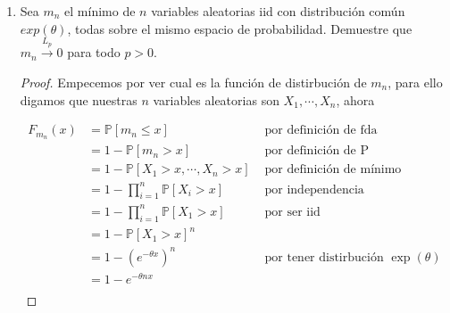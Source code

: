 \documentclass[letterpaper]{article}
\theoremstyle{definition}
\theoremstyle{lemathm}
\theoremstyle{lemademthm}
\newcommand{\pars}[1]{\left( #1 \right) }
\newcommand{\bracs}[1]{\left[ #1 \right] }
\newcommand{\1}{\mathbbm{1}}
\begin{document}
\begin{enumerate}
\begin{proof}
			\[\sum_{i=1}^d X_{i_n} + X_{{d+1}_{n}} \xrightarrow{P} \sum_{i=1}^d X_i + X_{d+1},\]

			es decir 

			\[\sum_{i=1}^{d+1} X_{i_n} \xrightarrow{P} \sum_{i=1}^{d+1} X_i.\]

			Por Inducción Matemática conluimos que la suma de $d$ suceciones convergentes en probabilidad convergen a la suma de sus límites.
		\end{proof}
		
		Recordemos que si $W_n \xrightarrow{L_p} W$ para algún $p\geq1$, entonces para todo $q < p$ se cumple que 
		
		\[W_n \xrightarrow{L_q} W.\]

		Ahora entonces que

		\[X_{n,j} \xrightarrow{L_{p_{n,j}}} X_j, p_{n,j} \geq 1,\]

		luego entonces

		\[X_{n,j} \xrightarrow{P} X_j.\]

		Ahora sean las proyecciones de cada componente $g_i(Y) = (0,\cdots,X_i,0,\cdots,0)$. Al ser $g_i$ continua por el Teorema del mapeo continuo tenemos que

		\[g_i(X_{n,i}) \xrightarrow{P} g_i(X_i).\]

		Por el Lema 2 tenemos

		\[\sum_{i=1}^d g_i(X_{n,i}) \xrightarrow{P} \sum_{i=1}^d g_i(X_i),\]

		por definición concluimos que

		\[\vec{X}_n\overset{P}{\to} \vec{X}\]

		\newpage

		\item Sea $m_n$ el mínimo de $n$ variables aleatorias iid con distribución común $exp(\theta)$, todas sobre el mismo espacio de probabilidad. Demuestre que $m_n\overset{L_p}{\to}0$ para todo $p>0$.
		
		\begin{proof}
			Empecemos por ver cual es la función de distirbución de $m_n$, para ello digamos que nuestras $n$ variables aleatorias son $X_1,\cdots,X_n$, ahora

			\begin{align*}
				F_{m_n}(x) &= \mathbb{P}\bracs{m_n \leq x} & \text{ por definición de fda}\\
				&= 1 - \mathbb{P}\bracs{m_n > x} & \text{ por definición de P}\\
				&= 1 - \mathbb{P}\bracs{X_1 > x, \cdots, X_n > x}& \text{ por definición de mínimo}\\
				&= 1 - \prod_{i=1}^n \mathbb{P}\bracs{X_i > x} & \text{ por independencia}\\
				&= 1 - \prod_{i=1}^n \mathbb{P}\bracs{X_1 > x} & \text{ por ser iid}\\
				&= 1 - \mathbb{P}\bracs{X_1 > x}^n\\
				&= 1 - \pars{e^{-\theta x}}^n & \text{ por tener distirbución $\exp(\theta)$}\\
				&= 1 - e^{-\theta n x}\\
			\end{align*}


\end{proof}
\end{enumerate}
\end{document}
